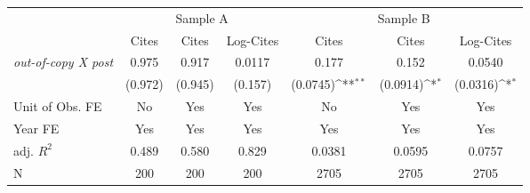 {
\def\sym#1{\ifmmode^{#1}\else\(^{#1}\)\fi}
\begin{tabular*}{\hsize}{@{\hskip\tabcolsep\extracolsep\fill}l*{6}{c}}
\toprule
            &\multicolumn{3}{c}{Sample A}                                     &\multicolumn{3}{c}{Sample B}                                     \\\cmidrule(lr){2-4}\cmidrule(lr){5-7}
            &\multicolumn{1}{c}{Cites}&\multicolumn{1}{c}{Cites}&\multicolumn{1}{c}{Log-Cites}&\multicolumn{1}{c}{Cites}&\multicolumn{1}{c}{Cites}&\multicolumn{1}{c}{Log-Cites}\\
\midrule
\emph{out-of-copy X post}&       0.975         &       0.917         &      0.0117         &       0.177         &       0.152         &      0.0540         \\
            &     (0.972)         &     (0.945)         &     (0.157)         &    (0.0745)\sym{**} &    (0.0914)\sym{*}  &    (0.0316)\sym{*}  \\
\midrule
Unit of Obs. FE&          No         &         Yes         &         Yes         &          No         &         Yes         &         Yes         \\
Year FE     &         Yes         &         Yes         &         Yes         &         Yes         &         Yes         &         Yes         \\
adj. $R^2$  &       0.489         &       0.580         &       0.829         &      0.0381         &      0.0595         &      0.0757         \\
N           &         200         &         200         &         200         &        2705         &        2705         &        2705         \\
\bottomrule
\end{tabular*}
}
